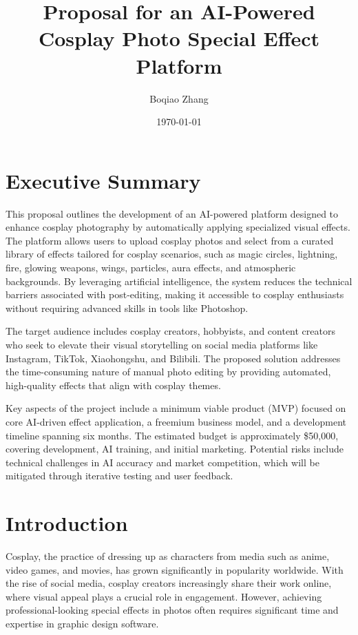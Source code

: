\documentclass[12pt]{article}
\title{Proposal for an AI-Powered Cosplay Photo Special Effect Platform}
\author{Boqiao Zhang}
\date{\today}
\begin{document}
\maketitle

\tableofcontents
\newpage

\section{Executive Summary}

This proposal outlines the development of an AI-powered platform designed to enhance cosplay photography by automatically applying specialized visual effects. The platform allows users to upload cosplay photos and select from a curated library of effects tailored for cosplay scenarios, such as magic circles, lightning, fire, glowing weapons, wings, particles, aura effects, and atmospheric backgrounds. By leveraging artificial intelligence, the system reduces the technical barriers associated with post-editing, making it accessible to cosplay enthusiasts without requiring advanced skills in tools like Photoshop.

The target audience includes cosplay creators, hobbyists, and content creators who seek to elevate their visual storytelling on social media platforms like Instagram, TikTok, Xiaohongshu, and Bilibili. The proposed solution addresses the time-consuming nature of manual photo editing by providing automated, high-quality effects that align with cosplay themes.

Key aspects of the project include a minimum viable product (MVP) focused on core AI-driven effect application, a freemium business model, and a development timeline spanning six months. The estimated budget is approximately \$50,000, covering development, AI training, and initial marketing. Potential risks include technical challenges in AI accuracy and market competition, which will be mitigated through iterative testing and user feedback.

\section{Introduction}

Cosplay, the practice of dressing up as characters from media such as anime, video games, and movies, has grown significantly in popularity worldwide. With the rise of social media, cosplay creators increasingly share their work online, where visual appeal plays a crucial role in engagement. However, achieving professional-looking special effects in photos often requires significant time and expertise in graphic design software.
\end{document}
